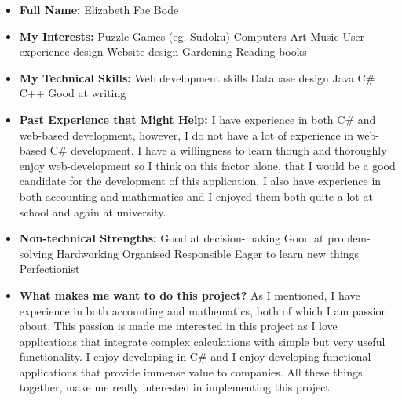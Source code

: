 \documentclass{article}
\begin{document}
	\begin{itemize}
		\item \textbf{Full Name:} Elizabeth Fae Bode
		\item \textbf{My Interests:}
		\subitem Puzzle Games (eg. Sudoku)
		\subitem Computers
		\subitem Art
		\subitem Music
		\subitem User experience design
		\subitem Website design
		\subitem Gardening
		\subitem Reading books
		
		\item \textbf{My Technical Skills:}
		\subitem Web development skills
		\subitem Database design
		\subitem Java
		\subitem C\#
		\subitem C++
		\subitem Good at writing
		
		\item \textbf{Past Experience that Might Help:} \newline
		I have experience in both C\# and web-based development, however, I do not have a lot of experience in web-based C\# development. I have a willingness to learn though and thoroughly enjoy web-development so I think on this factor alone, that I would be a good candidate for the development of this application. I also have experience in both accounting and mathematics and I enjoyed them both quite a lot at school and again at university.
		
		\item \textbf{Non-technical Strengths:}
		\subitem Good at decision-making
		\subitem Good at problem-solving
		\subitem Hardworking
		\subitem Organised
		\subitem Responsible
		\subitem Eager to learn new things
		\subitem Perfectionist
		
		\item \textbf{What makes me want to do this project?} \newline
		As I mentioned, I have experience in both accounting and mathematics, both of which I am passion about. This passion is made me interested in this project as I love applications that integrate complex calculations with simple but very useful functionality. I enjoy developing in C\# and I enjoy developing functional applications that provide immense value to companies. All these things together, make me really interested in implementing this project.
	\end{itemize}
	
\end{document}
